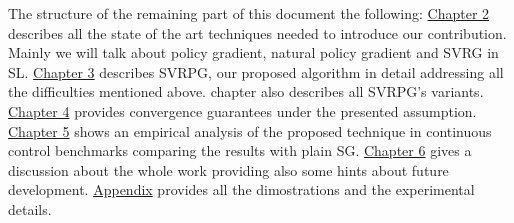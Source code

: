 The structure of the remaining part of this document the following:
\hyperref[chap:art]{Chapter 2} describes all the state of the art techniques needed to introduce our contribution. Mainly we will talk about policy gradient, natural policy gradient and \acs{SVRG} in \acs{SL}.\newline
\hyperref[chap:art]{Chapter 3} describes \acs{SVRPG}, our proposed algorithm in detail addressing all the difficulties mentioned above. chapter also describes all \acs{SVRPG}'s variants.\newline
\hyperref[chap:art]{Chapter 4} provides convergence guarantees under the presented assumption.\newline
\hyperref[chap:art]{Chapter 5} shows an empirical analysis of the proposed technique in continuous control benchmarks comparing the results with plain \acs{SG}.\newline
\hyperref[chap:art]{Chapter 6} gives a discussion about the whole work providing also some hints about future development.\newline
\hyperref[chap:art]{Appendix} provides all the dimostrations and the experimental details.
